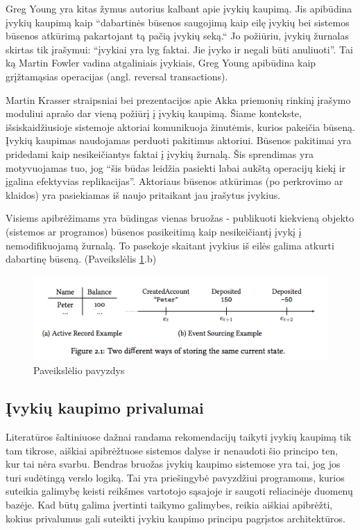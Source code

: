 Greg Young yra kitas žymus autorius kalbant apie įvykių kaupimą. Jis apibūdina įvykių kaupimą kaip “dabartinės būsenos saugojimą kaip eilę įvykių bei sistemos būsenos atkūrimą pakartojant tą pačią įvykių seką.“ \cite{Young:CQRS2010} Jo požiūriu, įvykių žurnalas skirtas tik įrašymui: “įvykiai yra lyg faktai. Jie įvyko ir negali būti anuliuoti”. \cite{Young:CQRS2013} Tai ką Martin Fowler vadina atgaliniais įvykiais, Greg Young apibūdina kaip grįžtamąsias operacijas (angl. reversal transactions).

Martin Krasser straipsniai bei prezentacijos apie Akka priemonių rinkinį įrašymo moduliui aprašo dar vieną požiūrį į įvykių kaupimą. \cite{Krasser:AkkaPersistence, Krasser:AkkaYoutube} Šiame kontekste, išsiskaidžiusioje sistemoje aktoriai komunikuoja žinutėmis, kurios pakeičia būseną. Įvykių kaupimas naudojamas perduoti pakitimus aktoriui. Būsenos pakitimai yra pridedami kaip nesikeičiantys faktai į įvykių žurnalą. Šis sprendimas yra motyvuojamas tuo, jog “šis būdas leidžia pasiekti labai aukštą operacijų kiekį ir įgalina efektyvias replikacijas”. Aktoriaus būsenos atkūrimas (po perkrovimo ar klaidos) yra pasiekiamas iš naujo pritaikant jau įrašytus įvykius.


Visiems apibrėžimams yra būdingas vienas bruožas - publikuoti kiekvieną objekto (sistemos ar programos) būsenos pasikeitimą kaip nesikeičiantį įvykį į nemodifikuojamą žurnalą. To pasekoje skaitant įvykius iš eilės galima atkurti dabartinę būseną. (Paveikslėlis \ref{img:current_state}.b)

\begin{figure}[H]
    \centering
    \includegraphics[scale=0.8]{img/current_state}
    \caption{Paveikslėlio pavyzdys}
    \label{img:current_state}
\end{figure}

\subsection{Įvykių kaupimo privalumai}

Literatūros šaltiniuose dažnai randama rekomendacijų taikyti įvykių kaupimą tik tam tikrose, aiškiai apibrėžtuose sistemos dalyse ir nenaudoti šio principo ten, kur tai nėra svarbu. \cite{Betts:2013:ECE:2509680} Bendras bruožas įvykių kaupimo sistemose yra tai, jog jos turi sudėtingą verslo logiką. Tai yra priešingybė pavyzdžiui programoms, kurios suteikia galimybę keisti reikšmes vartotojo sąsajoje ir saugoti reliacinėje duomenų bazėje. Kad būtų galima įvertinti taikymo galimybes, reikia aiškiai apibrėžti, kokius privalumus gali suteikti įvykiu kaupimo principu pagrįstos architektūros.

